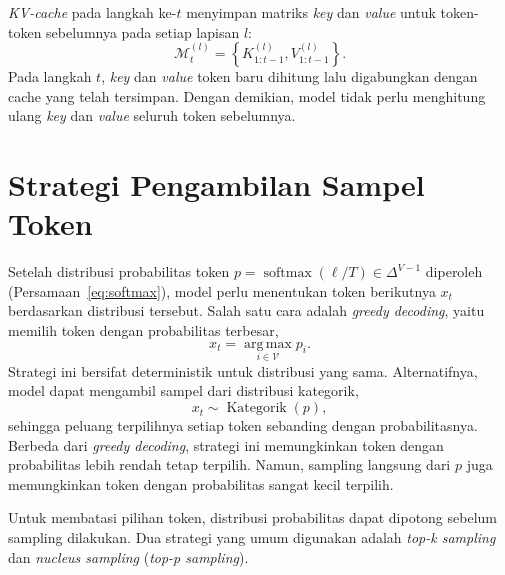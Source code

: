 \begin{definisi}
\label{def:kvcache}
\textit{KV-cache} pada langkah ke-$t$ menyimpan matriks \textit{key} dan
\textit{value} untuk token-token sebelumnya pada setiap lapisan $l$:
\begin{equation}
\mathcal{M}_t^{(l)}
=
\left\{K_{1:t-1}^{(l)},V_{1:t-1}^{(l)}\right\}.
\label{eq:kvcache}
\end{equation}
Pada langkah $t$, \textit{key} dan \textit{value} token baru dihitung lalu
digabungkan dengan cache yang telah tersimpan. Dengan demikian,
model tidak perlu menghitung ulang \textit{key} dan \textit{value} seluruh
token sebelumnya.
\end{definisi}



\section{Strategi Pengambilan Sampel Token}
\label{sec:sampling}

Setelah distribusi probabilitas token
$p=\operatorname{softmax}(\ell/T)\in\Delta^{V-1}$
diperoleh (Persamaan~\eqref{eq:softmax}), model perlu menentukan
token berikutnya $x_t$ berdasarkan distribusi tersebut. Salah satu
cara adalah \textit{greedy decoding}, yaitu memilih token dengan
probabilitas terbesar,
\begin{equation}
x_t=\operatorname*{arg\,max}_{i\in\mathcal{V}}p_i.
\label{eq:greedy}
\end{equation}
Strategi ini bersifat deterministik untuk distribusi yang sama.
Alternatifnya, model dapat mengambil sampel dari distribusi
kategorik,
\begin{equation}
x_t\sim\operatorname{Kategorik}(p),
\label{eq:categorical-sampling}
\end{equation}
sehingga peluang terpilihnya setiap token sebanding dengan
probabilitasnya. Berbeda dari \textit{greedy decoding}, strategi ini
memungkinkan token dengan probabilitas lebih rendah tetap terpilih.
Namun, sampling langsung dari $p$ juga memungkinkan token dengan
probabilitas sangat kecil terpilih.

Untuk membatasi pilihan token, distribusi probabilitas dapat
dipotong sebelum sampling dilakukan. Dua strategi yang umum
digunakan adalah \textit{top-k sampling} dan \textit{nucleus
sampling} (\textit{top-p sampling}).

